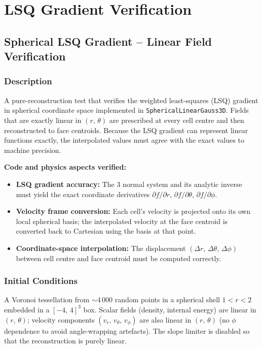 \documentclass[11pt,a4paper]{article}
\begin{document}
\newpage

\section{LSQ Gradient Verification}
\label{sec:lsq_gradient}

\subsection{Spherical LSQ Gradient -- Linear Field Verification}
\label{sec:spherical_gauss_linear}

\subsubsection*{Description}
A pure-reconstruction test that verifies the weighted least-squares (LSQ) gradient in spherical coordinate space implemented in \texttt{SphericalLinearGauss3D}. Fields that are exactly linear in $(r,\,\theta)$ are prescribed at every cell centre and then reconstructed to face centroids. Because the LSQ gradient can represent linear functions exactly, the interpolated values must agree with the exact values to machine precision.

\textbf{Code and physics aspects verified:}
\begin{itemize}
  \item \textbf{LSQ gradient accuracy:} The 3 normal system and its analytic inverse must yield the exact coordinate derivatives $\partial f/\partial r$, $\partial f/\partial\theta$, $\partial f/\partial\phi$.
  \item \textbf{Velocity frame conversion:} Each cell's velocity is projected onto its own local spherical basis; the interpolated velocity at the face centroid is converted back to Cartesian using the basis at that point.
  \item \textbf{Coordinate-space interpolation:} The displacement $(\Delta r,\,\Delta\theta,\,\Delta\phi)$ between cell centre and face centroid must be computed correctly.
\end{itemize}

\subsubsection*{Initial Conditions}
A Voronoi tessellation from $\sim$4\,000 random points in a spherical shell $1 < r < 2$ embedded in a $[-4,\,4]^3$ box. Scalar fields (density, internal energy) are linear in $(r,\,\theta)$; velocity components $(v_r,\,v_\theta,\,v_\phi)$ are also linear in $(r,\,\theta)$ (no $\phi$ dependence to avoid angle-wrapping artefacts). The slope limiter is disabled so that the reconstruction is purely linear.
\end{document}
